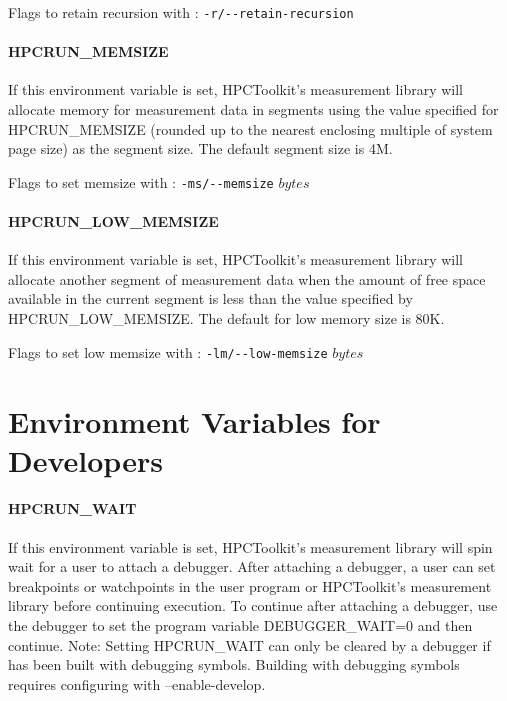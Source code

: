 \parg
Flags to retain recursion with \hpcrun: \verb|-r/--retain-recursion|

\paragraph{HPCRUN\_MEMSIZE}

If this environment variable is set, HPCToolkit's measurement library
will allocate memory for measurement data in segments using the
value specified for HPCRUN\_MEMSIZE (rounded up to the nearest
enclosing multiple of system page size) as the segment size. The
default segment size is 4M.

\parg
Flags to set memsize with \hpcrun: \verb|-ms/--memsize| $bytes$

\paragraph{HPCRUN\_LOW\_MEMSIZE}

If this environment variable is set, HPCToolkit's measurement library
will allocate another segment of measurement data when the amount
of free space available in the current segment is less than the
value specified by HPCRUN\_LOW\_MEMSIZE. The default for low memory
size is 80K.

\parg
Flags to set low memsize with \hpcrun: \verb|-lm/--low-memsize| $bytes$


\section{Environment Variables for Developers}
\label{system-env}

\paragraph{HPCRUN\_WAIT}

If this environment variable is set, HPCToolkit's measurement library
will spin wait for a user to attach a debugger. After attaching a
debugger, a user can set breakpoints or watchpoints in the user
program or HPCToolkit's measurement library before continuing
execution. To continue after attaching a debugger, use the debugger
to set the program variable DEBUGGER\_WAIT=0 and then continue.
Note: Setting HPCRUN\_WAIT can only be cleared by a debugger
if \HPCToolkit{} has been built with debugging symbols.
Building \HPCToolkit{} with debugging symbols requires
configuring \HPCToolkit{} with --enable-develop.

